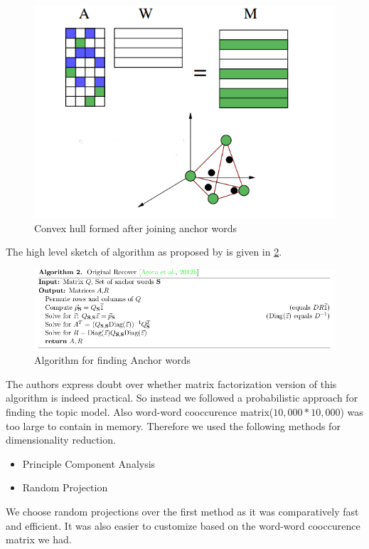 \documentclass[a4paper,11pt]{article}
\begin{document}
\begin{figure}[htb]
\includegraphics[scale=0.4]{convexhull.png}
\caption{Convex hull formed after joining anchor words \cite{tm}}
\label{fig:convexhull}
\end{figure}
The high level sketch of algorithm as proposed by \cite{tm} is given in \ref{fig:algorithm}.

\begin{figure}[htb]
\includegraphics[scale=0.5]{algorithm.png}
\caption{Algorithm for finding Anchor words }
\label{fig:algorithm}
\end{figure}

The authors express doubt over whether matrix factorization version of this algorithm is indeed practical. So instead we followed a probabilistic approach for finding the topic model. Also word-word cooccurence matrix($10,000*10,000$) was too large to contain in memory. Therefore we used the following methods for dimensionality reduction.

\begin{itemize}
\item Principle Component Analysis
\item Random Projection 
\end{itemize} 

We choose random projections over the first method as it was comparatively fast and efficient. It was also easier to customize based on the word-word cooccurence matrix we had.
\end{document}
